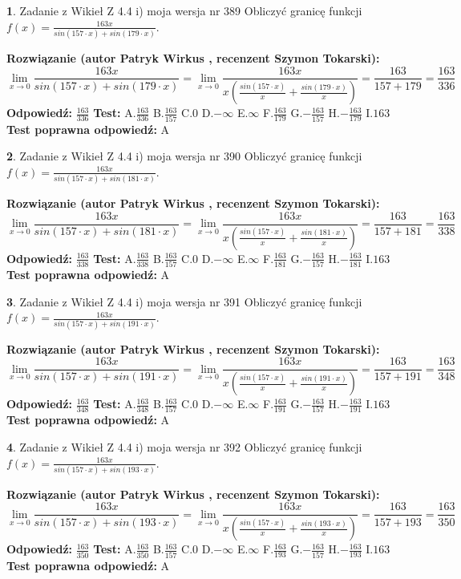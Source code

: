 \documentclass[12pt, a4paper]{article}
\theoremstyle{definition} %
\newtheorem{zad}{}
\newcommand{\zadStart}[1]{\begin{zad}#1\newline}
\newcommand{\zadStop}{\end{zad}}
\newcommand{\rozwStart}[2]{\noindent \textbf{Rozwiązanie (autor #1 , recenzent #2): }\newline}
\newcommand{\rozwStop}{\newline}
\newcommand{\odpStart}{\noindent \textbf{Odpowiedź:}\newline}
\newcommand{\odpStop}{\newline}
\newcommand{\testStart}{\noindent \textbf{Test:}\newline}
\newcommand{\testStop}{\newline}
\newcommand{\kluczStart}{\noindent \textbf{Test poprawna odpowiedź:}\newline}
\newcommand{\kluczStop}{\newline}
\begin{document}
\zadStart{Zadanie z Wikieł Z 4.4 i) moja wersja nr 389}
Obliczyć granicę funkcji $f(x)=\frac{163x}{sin(157\cdot x) +sin(179\cdot x)}$.
\zadStop
\rozwStart{Patryk Wirkus}{Szymon Tokarski}
$$\lim\limits_{x\to 0}\frac{163x}{sin(157\cdot x) +sin(179\cdot x)}=\lim\limits_{x\to 0}\frac{163x}{x(\frac{sin(157\cdot x)}{x}+\frac{sin(179\cdot x)}{x})}=\frac{163}{157+179} = \frac{163}{336}$$
\rozwStop
\odpStart
$\frac{163}{336}$
\odpStop
\testStart
A.$\frac{163}{336}$
B.$\frac{163}{157}$
C.$0$
D.$-\infty$
E.$\infty$
F.$\frac{163}{179}$
G.$-\frac{163}{157}$
H.$-\frac{163}{179}$
I.$163$
\testStop
\kluczStart
A
\kluczStop



\zadStart{Zadanie z Wikieł Z 4.4 i) moja wersja nr 390}
Obliczyć granicę funkcji $f(x)=\frac{163x}{sin(157\cdot x) +sin(181\cdot x)}$.
\zadStop
\rozwStart{Patryk Wirkus}{Szymon Tokarski}
$$\lim\limits_{x\to 0}\frac{163x}{sin(157\cdot x) +sin(181\cdot x)}=\lim\limits_{x\to 0}\frac{163x}{x(\frac{sin(157\cdot x)}{x}+\frac{sin(181\cdot x)}{x})}=\frac{163}{157+181} = \frac{163}{338}$$
\rozwStop
\odpStart
$\frac{163}{338}$
\odpStop
\testStart
A.$\frac{163}{338}$
B.$\frac{163}{157}$
C.$0$
D.$-\infty$
E.$\infty$
F.$\frac{163}{181}$
G.$-\frac{163}{157}$
H.$-\frac{163}{181}$
I.$163$
\testStop
\kluczStart
A
\kluczStop



\zadStart{Zadanie z Wikieł Z 4.4 i) moja wersja nr 391}
Obliczyć granicę funkcji $f(x)=\frac{163x}{sin(157\cdot x) +sin(191\cdot x)}$.
\zadStop
\rozwStart{Patryk Wirkus}{Szymon Tokarski}
$$\lim\limits_{x\to 0}\frac{163x}{sin(157\cdot x) +sin(191\cdot x)}=\lim\limits_{x\to 0}\frac{163x}{x(\frac{sin(157\cdot x)}{x}+\frac{sin(191\cdot x)}{x})}=\frac{163}{157+191} = \frac{163}{348}$$
\rozwStop
\odpStart
$\frac{163}{348}$
\odpStop
\testStart
A.$\frac{163}{348}$
B.$\frac{163}{157}$
C.$0$
D.$-\infty$
E.$\infty$
F.$\frac{163}{191}$
G.$-\frac{163}{157}$
H.$-\frac{163}{191}$
I.$163$
\testStop
\kluczStart
A
\kluczStop



\zadStart{Zadanie z Wikieł Z 4.4 i) moja wersja nr 392}
Obliczyć granicę funkcji $f(x)=\frac{163x}{sin(157\cdot x) +sin(193\cdot x)}$.
\zadStop
\rozwStart{Patryk Wirkus}{Szymon Tokarski}
$$\lim\limits_{x\to 0}\frac{163x}{sin(157\cdot x) +sin(193\cdot x)}=\lim\limits_{x\to 0}\frac{163x}{x(\frac{sin(157\cdot x)}{x}+\frac{sin(193\cdot x)}{x})}=\frac{163}{157+193} = \frac{163}{350}$$
\rozwStop
\odpStart
$\frac{163}{350}$
\odpStop
\testStart
A.$\frac{163}{350}$
B.$\frac{163}{157}$
C.$0$
D.$-\infty$
E.$\infty$
F.$\frac{163}{193}$
G.$-\frac{163}{157}$
H.$-\frac{163}{193}$
I.$163$
\testStop
\kluczStart
A
\kluczStop
\end{document}
